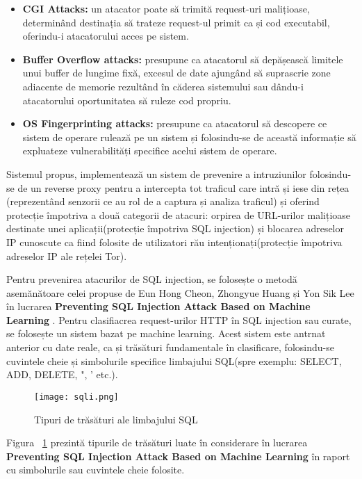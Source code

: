 \begin{itemize}
	\item \textbf{CGI Attacks:}  un atacator poate să trimită request-uri malițioase, determinând destinația să trateze request-ul primit ca și cod executabil, oferindu-i atacatorului acces pe sistem. 
	\item \textbf{Buffer Overflow attacks:}  presupune ca atacatorul să depășească limitele unui buffer de lungime fixă, excesul de date ajungând să suprascrie zone adiacente de memorie rezultând în căderea sistemului sau dându-i atacatorului oportunitatea să ruleze cod propriu. 
	\item \textbf{OS Fingerprinting attacks:}  presupune ca atacatorul să descopere ce sistem de operare rulează pe un sistem și folosindu-se de această informație să expluateze vulnerabilități specifice acelui sistem de operare. 
\end{itemize}

Sistemul propus, \textit{\thesistitle}  implementează un sistem de prevenire a intruziunilor folosindu-se de un reverse proxy pentru a intercepta tot traficul care intră și iese din rețea (reprezentând senzorii ce au rol de a captura și analiza traficul) și oferind protecție împotriva a două categorii de atacuri: orpirea de URL-urilor malițioase destinate unei aplicații(protecție împotriva SQL injection) și blocarea adreselor IP cunoscute ca fiind folosite de utilizatori rău intenționați(protecție împotriva adreselor IP ale rețelei Tor). 

Pentru prevenirea atacurilor de SQL injection, se folosește o metodă asemănătoare celei propuse de Eun Hong Cheon, Zhongyue Huang și Yon Sik Lee în lucrarea  \textbf{Preventing SQL Injection Attack Based on Machine Learning} \cite{sqli_how}. Pentru clasifiacrea request-urilor HTTP în SQL injection sau curate, se folosește un sistem bazat pe machine learning. Acest sistem este antrnat anterior cu date reale, ca și trăsături fundamentale în clasificare, folosindu-se cuvintele cheie și simbolurile specifice limbajului SQL(spre exemplu: SELECT, ADD, DELETE, ", ' etc.). 

\begin{figure}[h]
\centering
\texttt{[image: sqli.png]}
\caption{ Tipuri de trăsături ale limbajului SQL }
\label{fig:sql-features}
\end{figure}

Figura ~\ref{fig:sql-features}  prezintă tipurile de trăsături luate în considerare în lucrarea \textbf{Preventing SQL Injection Attack Based on Machine Learning} în raport cu simbolurile sau cuvintele cheie folosite.  


